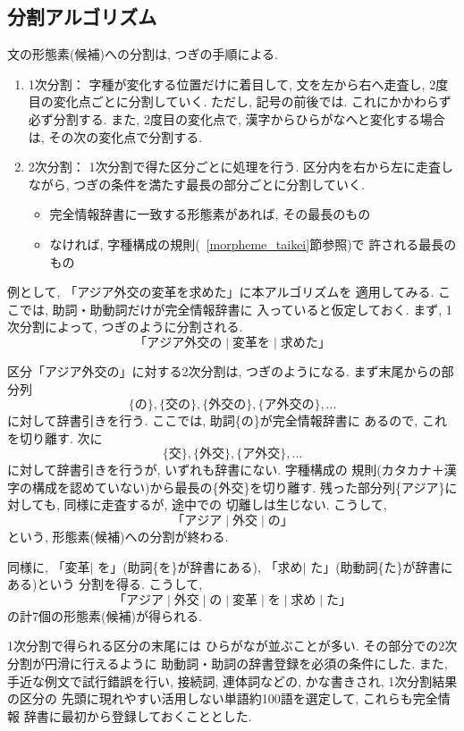 \subsection{分割アルゴリズム}
\label{jishukiri}
文の形態素(候補)への分割は, つぎの手順による.  
\begin{enumerate}
\item
1次分割：
字種が変化する位置だけに着目して, 文を左から右へ走査し, 
2度目の変化点ごとに分割していく.  ただし, 記号の前後では.  
これにかかわらず必ず分割する.  また, 2度目の変化点で, 
漢字からひらがなへと変化する場合は, その次の変化点で分割する.  
\item
2次分割：
1次分割で得た区分ごとに処理を行う.  区分内を右から左に走査しながら, 
つぎの条件を満たす最長の部分ごとに分割していく.  
\begin{itemize}
\item
完全情報辞書に一致する形態素があれば, その最長のもの
\item
なければ, 字種構成の規則(~\ref{morpheme_taikei}節参照)で
許される最長のもの
\end{itemize}
\end{enumerate}


例として, 「アジア外交の変革を求めた」に本アルゴリズムを
適用してみる.  ここでは, 助詞・助動詞だけが完全情報辞書に
入っていると仮定しておく.  
まず, 1次分割によって, つぎのように分割される.  
$$ 「アジア外交の \mid  変革を \mid  求めた」$$

区分「アジア外交の」に対する2次分割は, つぎのようになる.  
まず末尾からの部分列
$$\{の\}, \{交の\}, \{外交の\}, \{ア外交の\}, ...$$
 に対して辞書引きを行う.  ここでは, 助詞\{の\}が完全情報辞書に
あるので, これを切り離す.  次に
$$\{交\}, \{外交\}, \{ア外交\}, ...$$
に対して辞書引きを行うが, いずれも辞書にない.  字種構成の
規則(カタカナ＋漢字の構成を認めていない)から最長の\{外交\}を切り離す.  
残った部分列\{アジア\}に対しても, 同様に走査するが, 途中での
切離しは生じない.  こうして, 
$$「アジア\mid  外交\mid  の」$$
という, 形態素(候補)への分割が終わる.  

同様に, 「変革$\mid$ を」(助詞\{を\}が辞書にある), 
「求め$\mid$ た」(助動詞\{た\}が辞書にある)という
分割を得る.  
こうして, 
$$「アジア \mid  外交 \mid  の \mid  変革 \mid  を \mid  
求め \mid  た」$$
の計7個の形態素(候補)が得られる.  


1次分割で得られる区分の末尾には
ひらがなが並ぶことが多い.  その部分での2次分割が円滑に行えるように
助動詞・助詞の辞書登録を必須の条件にした. 
また, 手近な例文で試行錯誤を行い, 
接続詞, 連体詞などの, かな書きされ, 1次分割結果の区分の
先頭に現れやすい活用しない単語約100語を選定して, これらも完全情報
辞書に最初から登録しておくこととした.  

